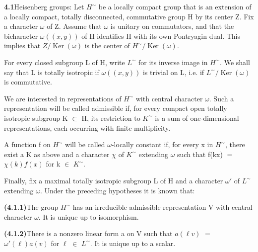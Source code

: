 \documentclass[10pt,a4paper]{article}
\begin{document}
\clearpage
{}
\label{d035-physical-019}
\par\medskip{}\par\smallskip
\par\noindent\textbf{4.1}\quad Heisenberg groups: Let $H^\sim$ be a locally compact group that is an extension of a locally compact, totally disconnected, commutative group H by its center Z. Fix a character $\omega{}$ of Z. Assume that $\omega{}$ is unitary on commutators, and that the bicharacter $\omega{}((x,y))$ of H identifies H with its own Pontryagin dual. This implies that $Z/\operatorname{Ker}(\omega{})$ is the center of $H^\sim/\operatorname{Ker}(\omega{})$.\par
\par For every closed subgroup L of H, write $L^\sim$ for its inverse image in $H^\sim$. We shall say that L is totally isotropic if $\omega{}((x,y))$ is trivial on L, i.e. if $L^\sim/\operatorname{Ker}(\omega{})$ is commutative.\par
\par We are interested in representations of $H^\sim$ with central character $\omega{}$. Such a representation will be called admissible if, for every compact open totally isotropic subgroup K $\subset{}$ H, its restriction to $K^\sim$ is a sum of one-dimensional representations, each occurring with finite multiplicity.\par
\par A function f on $H^\sim$ will be called $\omega{}$-locally constant if, for every x in $H^\sim$, there exist a K as above and a character $\chi{}$ of $K^\sim$ extending $\omega{}$ such that f(kx) $=$ $\chi{}(k)f(x)$ for k $\in{}$ $K^\sim$.\par
\par Finally, fix a maximal totally isotropic subgroup L of H and a character $\omega{}'$ of $L^\sim$ extending $\omega{}$. Under the preceding hypotheses it is known that:\par
\par\noindent\textbf{(4.1.1)}\quad The group $H^\sim$ has an irreducible admissible representation V with central character $\omega{}$. It is unique up to isomorphism.\par
\par\noindent\textbf{(4.1.2)}\quad There is a nonzero linear form a on V such that $a(\ell{}v)$ $=$ $\omega{}'(\ell{})a(v)$ for $\ell{}$ $\in{}$ $L^\sim$. It is unique up to a scalar.\par
\end{document}
